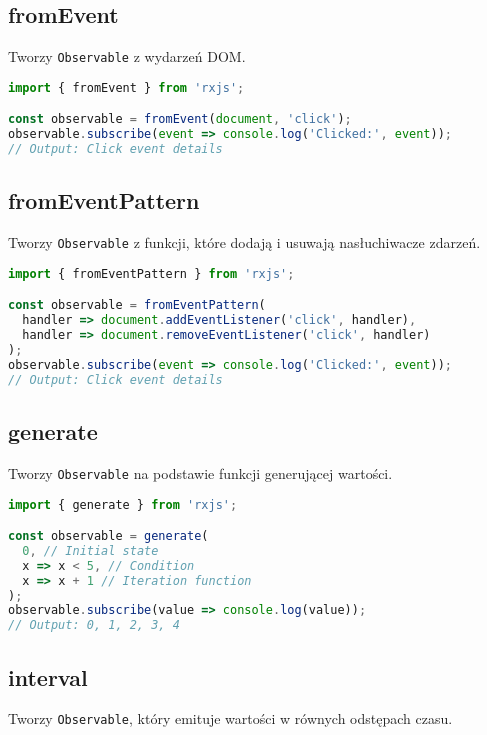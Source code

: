 \documentclass[a4paper,12pt]{article}
\begin{document}
\subsection{fromEvent}
Tworzy \texttt{Observable} z wydarzeń DOM.

\begin{lstlisting}[language=JavaScript, caption=Przykład użycia \texttt{fromEvent}]
import { fromEvent } from 'rxjs';

const observable = fromEvent(document, 'click');
observable.subscribe(event => console.log('Clicked:', event));
// Output: Click event details
\end{lstlisting}

\subsection{fromEventPattern}
Tworzy \texttt{Observable} z funkcji, które dodają i usuwają nasłuchiwacze zdarzeń.

\begin{lstlisting}[language=JavaScript, caption=Przykład użycia \texttt{fromEventPattern}]
import { fromEventPattern } from 'rxjs';

const observable = fromEventPattern(
  handler => document.addEventListener('click', handler),
  handler => document.removeEventListener('click', handler)
);
observable.subscribe(event => console.log('Clicked:', event));
// Output: Click event details
\end{lstlisting}

\subsection{generate}
Tworzy \texttt{Observable} na podstawie funkcji generującej wartości.

\begin{lstlisting}[language=JavaScript, caption=Przykład użycia \texttt{generate}]
import { generate } from 'rxjs';

const observable = generate(
  0, // Initial state
  x => x < 5, // Condition
  x => x + 1 // Iteration function
);
observable.subscribe(value => console.log(value));
// Output: 0, 1, 2, 3, 4
\end{lstlisting}

\subsection{interval}
Tworzy \texttt{Observable}, który emituje wartości w równych odstępach czasu.
\end{document}
